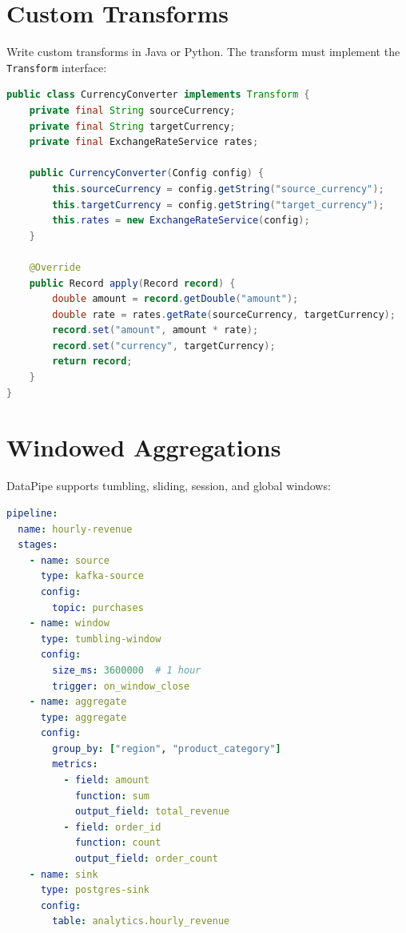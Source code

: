 \documentclass[
    language=english,
    doctype=manual,
    institution=none,
    titlestyle=book,
    oneside,
]{../../omnilatex}
\begin{document}
\section{Custom Transforms}

Write custom transforms in Java or Python. The transform must implement
the \texttt{Transform} interface:

\begin{lstlisting}[language=java, caption={Custom Java transform.}]
public class CurrencyConverter implements Transform {
    private final String sourceCurrency;
    private final String targetCurrency;
    private final ExchangeRateService rates;

    public CurrencyConverter(Config config) {
        this.sourceCurrency = config.getString("source_currency");
        this.targetCurrency = config.getString("target_currency");
        this.rates = new ExchangeRateService(config);
    }

    @Override
    public Record apply(Record record) {
        double amount = record.getDouble("amount");
        double rate = rates.getRate(sourceCurrency, targetCurrency);
        record.set("amount", amount * rate);
        record.set("currency", targetCurrency);
        return record;
    }
}
\end{lstlisting}

\section{Windowed Aggregations}

DataPipe supports tumbling, sliding, session, and global windows:

\begin{lstlisting}[language=yaml, caption={Windowed aggregation pipeline.}]
pipeline:
  name: hourly-revenue
  stages:
    - name: source
      type: kafka-source
      config:
        topic: purchases
    - name: window
      type: tumbling-window
      config:
        size_ms: 3600000  # 1 hour
        trigger: on_window_close
    - name: aggregate
      type: aggregate
      config:
        group_by: ["region", "product_category"]
        metrics:
          - field: amount
            function: sum
            output_field: total_revenue
          - field: order_id
            function: count
            output_field: order_count
    - name: sink
      type: postgres-sink
      config:
        table: analytics.hourly_revenue
\end{lstlisting}
\end{document}
